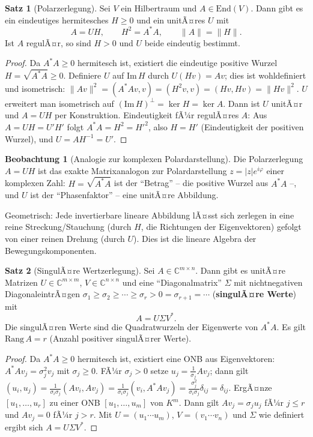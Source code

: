 ﻿\documentclass[a4paper,12pt]{report}
\theoremstyle{definition}
\newtheorem{satz}{Satz}
\newtheorem{beobachtung}{Beobachtung}
\begin{document}
\begin{satz}[Polarzerlegung]
    Sei $V$ ein Hilbertraum und $A \in \mathrm{End}(V)$. Dann gibt es
    ein eindeutiges hermitesches $H \geq 0$ und ein unitÃ¤res $U$ mit
    \[
        A = UH, \qquad H^2 = A^*A, \qquad \|A\| = \|H\|.
    \]
    Ist $A$ regulÃ¤r, so sind $H > 0$ und $U$ beide eindeutig bestimmt.
\end{satz}
\begin{proof}
    Da $A^*A \geq 0$ hermitesch ist, existiert die eindeutige positive Wurzel
    $H = \sqrt{A^*A} \geq 0$. Definiere $U$ auf $\mathrm{Im}\, H$ durch $U(Hv) = Av$;
    dies ist wohldefiniert und isometrisch:
    $\|Av\|^2 = (A^*Av, v) = (H^2 v, v) = (Hv, Hv) = \|Hv\|^2$.
    $U$ erweitert man isometrisch auf $(\mathrm{Im}\, H)^\perp = \ker H = \ker A$.
    Dann ist $U$ unitÃ¤r und $A = UH$ per Konstruktion.
    Eindeutigkeit fÃ¼r regulÃ¤res $A$: Aus $A = UH = U'H'$ folgt
    $A^*A = H^2 = H'^2$, also $H = H'$ (Eindeutigkeit der positiven Wurzel),
    und $U = AH^{-1} = U'$.
\end{proof}


\begin{beobachtung}[Analogie zur komplexen Polardarstellung]
    Die Polarzerlegung $A = UH$ ist das exakte Matrixanalogon zur
    Polardarstellung $z = |z| e^{i\varphi}$ einer komplexen Zahl:
    $H = \sqrt{A^*A}$ ist der ``Betrag'' -- die positive
    Wurzel aus $A^*A$ --, und $U$ ist der ``Phasenfaktor'' --
    eine unitÃ¤re Abbildung.

    Geometrisch: Jede invertierbare lineare Abbildung lÃ¤sst sich
    zerlegen in eine reine Streckung/Stauchung (durch $H$, die
    Richtungen der Eigenvektoren) gefolgt von einer reinen Drehung
    (durch $U$). Dies ist die lineare Algebra der Bewegungskomponenten.
\end{beobachtung}

\begin{satz}[SingulÃ¤re Wertzerlegung]
    Sei $A \in \mathbb{C}^{m \times n}$. Dann gibt es unitÃ¤re Matrizen
    $U \in \mathbb{C}^{m \times m}$, $V \in \mathbb{C}^{n \times n}$ und
    eine ``Diagonalmatrix'' $\Sigma$ mit nichtnegativen DiagonaleintrÃ¤gen
    $\sigma_1 \geq \sigma_2 \geq \cdots \geq \sigma_r > 0 = \sigma_{r+1} = \cdots$
    (\textbf{singulÃ¤re Werte}) mit
    \[
        A = U \Sigma V^*.
    \]
    Die singulÃ¤ren Werte sind die Quadratwurzeln der Eigenwerte von $A^*A$.
    Es gilt $\mathrm{Rang}\, A = r$ (Anzahl positiver singulÃ¤rer Werte).
\end{satz}
\begin{proof}
    Da $A^*A \geq 0$ hermitesch ist, existiert eine ONB
    aus Eigenvektoren: $A^*A v_j = \sigma_j^2 v_j$ mit $\sigma_j \geq 0$.
    FÃ¼r $\sigma_j > 0$ setze $u_j = \frac{1}{\sigma_j} A v_j$; dann gilt
    $(u_i, u_j) = \tfrac{1}{\sigma_i \sigma_j}(Av_i, Av_j) = \tfrac{1}{\sigma_i \sigma_j}
    (v_i, A^*Av_j) = \frac{\sigma_j^2}{\sigma_i \sigma_j} \delta_{ij} = \delta_{ij}$.
    ErgÃ¤nze $[u_1, \ldots, u_r]$ zu einer ONB $[u_1, \ldots, u_m]$ von $K^m$.
    Dann gilt $A v_j = \sigma_j u_j$ fÃ¼r $j \leq r$ und $A v_j = 0$ fÃ¼r $j > r$.
    Mit $U = (u_1 \cdots u_m)$, $V = (v_1 \cdots v_n)$ und $\Sigma$ wie definiert
    ergibt sich $A = U \Sigma V^*$.
\end{proof}
\end{document}
